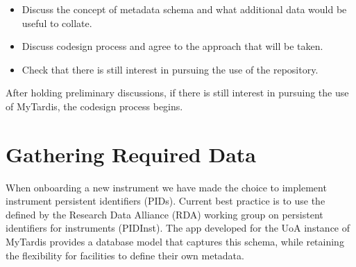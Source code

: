 \documentclass[letterpaper,10pt,english]{sphinxmanual}
\begin{document}
\begin{itemize}
\begin{itemize}
\item {} 
\sphinxAtStartPar
Discuss the concept of metadata schema and what additional data would be useful to collate.

\item {} 
\sphinxAtStartPar
Discuss co\sphinxhyphen{}design process and agree to the approach that will be taken.

\item {} 
\sphinxAtStartPar
Check that there is still interest in pursuing the use of the repository.

\end{itemize}

\end{itemize}

\sphinxAtStartPar
After holding preliminary discussions, if there is still interest in pursuing the use of MyTardis, the co\sphinxhyphen{}design process begins.


\section{Gathering Required Data}
\label{\detokenize{index:gathering-required-data}}\label{\detokenize{index:gathering-data}}
\sphinxAtStartPar
When onboarding a new instrument we have made the choice to implement instrument persistent identifiers (PIDs). Current best practice is to use the  defined by the Research Data Alliance (RDA) working group on persistent identifiers for instruments (PIDInst). The  app developed for the UoA instance of MyTardis provides a database model that captures this schema, while retaining the flexibility for facilities to define their own metadata.
\end{document}
